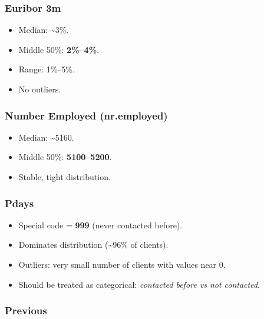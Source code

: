 \documentclass[
]{article}
\providecommand{\tightlist}{%
  \setlength{\itemsep}{0pt}\setlength{\parskip}{0pt}}
\begin{document}
\subsubsection{Euribor 3m}\label{euribor-3m}

\begin{itemize}
\tightlist
\item
  Median: \textasciitilde3\%.\\
\item
  Middle 50\%: \textbf{2\%--4\%}.\\
\item
  Range: 1\%--5\%.\\
\item
  No outliers.
\end{itemize}

\subsubsection{Number Employed
(nr.employed)}\label{number-employed-nr.employed}

\begin{itemize}
\tightlist
\item
  Median: \textasciitilde5160.\\
\item
  Middle 50\%: \textbf{5100--5200}.\\
\item
  Stable, tight distribution.
\end{itemize}

\subsubsection{Pdays}\label{pdays}

\begin{itemize}
\tightlist
\item
  Special code = \textbf{999} (never contacted before).\\
\item
  Dominates distribution (\textasciitilde96\% of clients).\\
\item
  Outliers: very small number of clients with values near 0.\\
\item
  Should be treated as categorical: \emph{contacted before vs not
  contacted}.
\end{itemize}

\subsubsection{Previous}\label{previous}
\end{document}
